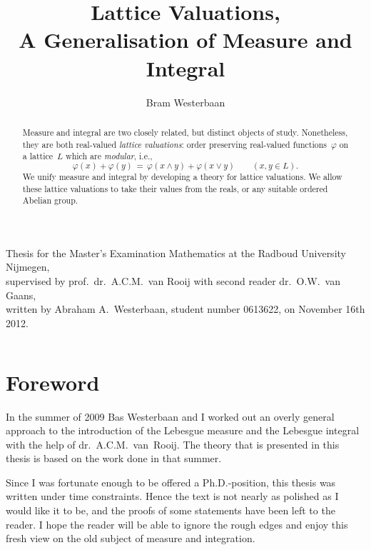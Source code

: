 \documentclass[main.tex]{subfiles}
\begin{document}
 

\title[A Generalisation of Measure and Integral]{Lattice Valuations,\\
A Generalisation of Measure and Integral}

\author[A.A.~Westerbaan]{Bram Westerbaan}
\maketitle


\vspace{1cm}


\vfill
\noindent
{\tiny
Thesis for the Master's Examination
Mathematics at the Radboud University Nijmegen,\\
supervised by prof.~dr.~A.C.M.~van Rooij
with second reader dr.~O.W.~van Gaans,\\
written by Abraham A.~Westerbaan, 
student number 0613622,
on November 16th 2012.

}
\thispagestyle{empty}
\clearpage
$\,$
\newpage
\begin{abstract}
Measure and integral are two closely related,
but distinct objects of study.
Nonetheless,
they are both real-valued \emph{lattice valuations}:
order preserving real-valued functions~$\varphi$
on a lattice~$L$
which are \emph{modular}, i.e.,
\begin{equation*}
\varphi(x) + \varphi(y) 
\,=\, 
\varphi(x\wedge y) + \varphi(x\vee y)\qquad(x,y\in L).
\end{equation*}
We unify measure and integral
by developing a theory for lattice valuations.
We allow these lattice valuations
to take their values from the reals,
or any suitable ordered Abelian group.
\end{abstract}

\clearpage
%
%
\section*{Foreword}
\noindent
In the summer of 2009  Bas Westerbaan
and I worked out an 
overly general approach
to the introduction of the Lebesgue measure and the Lebesgue integral
with the help of dr.~A.C.M.~van~Rooij.
The theory that is presented in this thesis
is based on the work done in that summer.

Since I was fortunate enough to be offered
a Ph.D.-position,
this thesis was written under time constraints.
Hence the text is not nearly as polished as 
I would like it to be,
and the proofs of some statements
have been left to the reader.
I hope the reader will be able to ignore the rough edges
and enjoy this fresh view on the old subject
of measure and integration.
\end{document}
